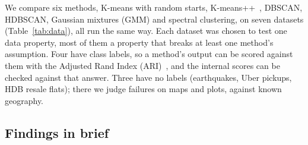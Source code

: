 We compare six methods, K-means with random starts, K-means++~\cite{arthur2007}, DBSCAN, HDBSCAN, Gaussian
mixtures (GMM) and spectral clustering, on seven datasets (Table~\ref{tab:data}), all run the same way. Each
dataset was chosen to test one data property, most of them a property that breaks at least one method's
assumption. Four have class labels, so a method's output can be scored against them with the Adjusted
Rand Index (ARI)~\cite{hubert1985}, and the internal scores can be checked against that answer. Three
have no labels (earthquakes, Uber pickups, HDB resale flats); there we judge failures on maps and plots,
against known geography.

\subsection{Findings in brief}
